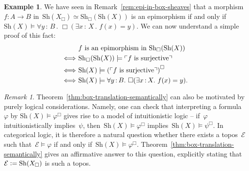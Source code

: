 \documentclass[10pt]{amsart}
\theoremstyle{definition}
\newtheorem{ex}[defn]{Example}
\theoremstyle{plain}
\theoremstyle{remark}
\newtheorem{rem}[defn]{Remark}
\newcommand{\E}{\mathcal{E}}
\newcommand{\Sh}{\mathrm{Sh}}
\newcommand{\?}{\,{:}\,}
\renewcommand{\_}{\mathpunct{.}\,}
\newcommand{\speak}[1]{\ulcorner\text{\textnormal{#1}}\urcorner}
\newcommand{\defeq}{\vcentcolon=}
\begin{document}
\begin{ex}We have seen in Remark~\ref{rem:epi-in-box-sheaves} that a
morphism~$f : A \to B$ in~$\Sh(X_\Box) \simeq \Sh_\Box(\Sh(X))$ is an
epimorphism if and only if~$\Sh(X) \models \forall y\?B\_ \Box(\exists x\?X\_
f(x) = y)$. We can now understand a simple proof of this fact:
\begin{align*}
  &\ \text{$f$ is an epimorphism in~$\Sh_\Box(\Sh(X))$} \\
  \Longleftrightarrow&\
    \Sh_\Box(\Sh(X)) \models \speak{$f$ is surjective} \\
  \Longleftrightarrow&\
    \Sh(X) \models \left(\speak{$f$ is surjective}\right)^\Box \\
  \Longleftrightarrow&\
    \Sh(X) \models \forall y\?B\_ \Box(\exists x\?X\_ f(x) = y).
\end{align*}
\end{ex}

\begin{rem}Theorem~\ref{thm:box-translation-semantically} can also be motivated
by purely logical considerations. Namely, one can check that interpreting a
formula~$\varphi$ by $\Sh(X) \models \varphi^\Box$ gives rise to a model of
intuitionistic logic -- if~$\varphi$ intuitionistically implies~$\psi$,
then~$\Sh(X) \models \varphi^\Box$ implies~$\Sh(X) \models \psi^\Box$. In
categorical logic, it is therefore a natural question whether there exists a
topos~$\E$ such that~$\E \models \varphi$ if and only if~$\Sh(X) \models
\varphi^\Box$. Theorem~\ref{thm:box-translation-semantically} gives an
affirmative answer to this question, explicitly stating that~$\E \defeq
\Sh(X_\Box)$ is such a topos.\end{rem}
\end{document}
